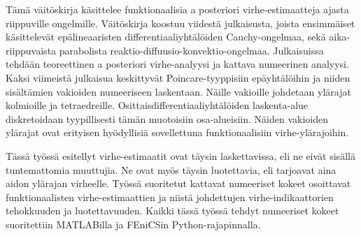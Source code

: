 \finnishsummary


T\"am\"a v\"ait\"oskirja k\"asittelee funktionaalisia a posteriori virhe-estimaatteja ajasta riippuville ongelmille. V\"ait\"oskirja koostuu viidest\"a julkaisusta, joista ensimm\"aiset k\"asittelev\"at ep\"alineaaristen differentiaaliyht\"al\"oiden Cauchy-ongelmaa, sek\"a aika-riippuvaista parabolista reaktio-diffuusio-konvektio-ongelmaa. Julkaisuissa tehd\"a\"an teoreettinen a posteriori virhe-analyysi ja kattava numeerinen analyysi. Kaksi viimeist\"a julkaisua keskittyv\"at Poincare-tyyppisiin ep\"ayht\"al\"oihin ja niiden sis\"alt\"amien vakioiden numeeriseen laskentaan. N\"aille vakioille johdetaan yl\"arajat kolmioille ja tetraedreille. Osittaisdifferentiaaliyht\"al\"oiden laskenta-alue diskretoidaan tyypillisesti t\"am\"an muotoisiin osa-alueisiin. N\"aiden vakioiden yl\"arajat ovat erityisen hy\"odyllisi\"a sovellettuna funktionaalisiin virhe-yl\"arajoihin.

T\"ass\"a ty\"oss\"a esitellyt virhe-estimaatit ovat t\"aysin laskettavissa, eli ne eiv\"at sis\"all\"a tuntemattomia muuttujia. Ne ovat my\"os t\"aysin luotettavia, eli tarjoavat aina aidon yl\"arajan virheelle. Ty\"oss\"a suoritetut kattavat numeeriset kokeet osoittavat funktionaalisten virhe-estimaattien ja niist\"a johdettujen virhe-indikaattorien tehokkuuden ja luotettavuuden. Kaikki t\"ass\"a ty\"oss\"a tehdyt numeeriset kokeet suoritettiin MATLABilla ja FEniCSin Python-rajapinnalla.

